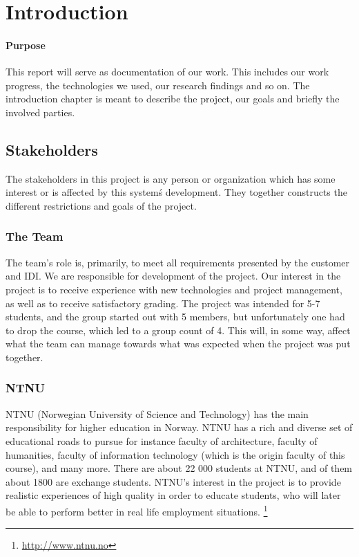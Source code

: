 \chapter{Introduction}

\minitoc

\subsubsection{Purpose}
This report will serve as documentation of our work. This includes our work progress, the technologies we used, our research findings and so on. The introduction chapter is meant to describe the project, our goals and briefly the involved parties.

\clearpage

\section{Stakeholders}

The stakeholders in this project is any person or organization which has some interest or is affected by this system\'s development. They together constructs the different restrictions and goals of the project.

\subsection{The Team}
The team's role is, primarily, to meet all requirements presented by the customer and IDI. We are responsible for development of the project. Our interest in the project is to receive experience with new technologies and project management, as well as to receive satisfactory grading.
The project was intended for 5-7 students, and the group started out with 5 members, but unfortunately one had to drop the course, which led to a group count of 4. This will, in some way, affect what the team can manage towards what was expected when the project was put together.

\subsection{NTNU}
\label{NTNU}
NTNU (Norwegian University of Science and Technology) has the main responsibility for higher education in Norway. NTNU has a rich and diverse set of educational roads to pursue for instance faculty of architecture, faculty of humanities, faculty of information technology (which is the origin faculty of this course), and many more. There are about 22 000 students at NTNU, and of them about 1800 are exchange students. NTNU’s interest in the project is to provide realistic experiences of high quality in order to educate students, who will later be able to perform better in real life employment situations.
\footnote{\url{http://www.ntnu.no}}

